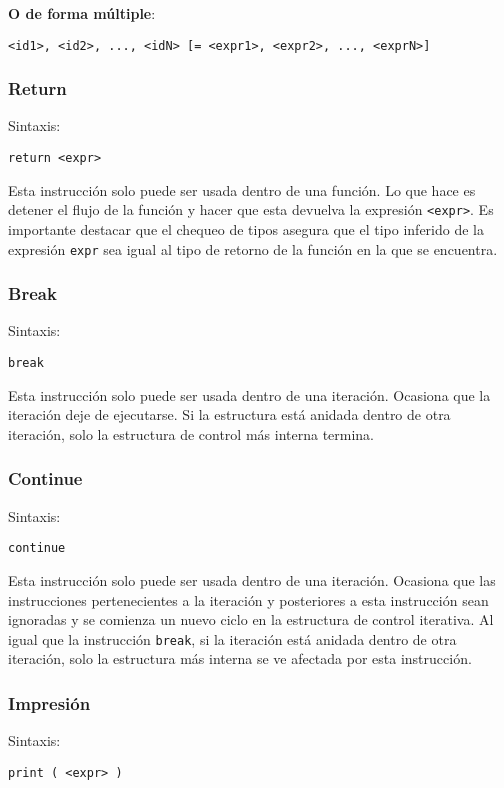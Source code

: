 \documentclass[12pt, spanish]{report}
\begin{document}
\textbf{O de forma m\'ultiple}:
\begin{verbatim}
<id1>, <id2>, ..., <idN> [= <expr1>, <expr2>, ..., <exprN>]
\end{verbatim}

\subsubsection{Return}
\label{sec:return}
Sintaxis:
\begin{verbatim}
return <expr>
\end{verbatim}

Esta instrucci\'on solo puede ser usada dentro de una funci\'on. Lo
que hace es detener el flujo de la funci\'on y hacer que esta devuelva
la expresi\'on \texttt{<expr>}. Es importante destacar que el chequeo
de tipos asegura que el tipo inferido de la expresi\'on \texttt{expr}
sea igual al tipo de retorno de la funci\'on en la que se encuentra.

\subsubsection{Break}
\label{sec:return}
Sintaxis:
\begin{verbatim}
break
\end{verbatim}

Esta instrucci\'on solo puede ser usada dentro de una
iteraci\'on. Ocasiona que la iteraci\'on deje de ejecutarse.
Si la estructura est\'a anidada dentro de otra iteraci\'on,
solo la estructura de control m\'as interna termina.

\subsubsection{Continue}
\label{sec:return}
Sintaxis:
\begin{verbatim}
continue
\end{verbatim}

Esta instrucci\'on solo puede ser usada dentro de una
iteraci\'on. Ocasiona que las instrucciones pertenecientes a la
iteraci\'on y posteriores a esta instrucci\'on sean ignoradas y se
comienza un nuevo ciclo en la estructura de control iterativa.  Al
igual que la instrucci\'on \texttt{break}, si la iteraci\'on est\'a
anidada dentro de otra iteraci\'on, solo la estructura m\'as interna
se ve afectada por esta instrucci\'on.

\subsubsection{Impresi\'on}
Sintaxis:
\begin{verbatim}
print ( <expr> )
\end{verbatim}
\end{document}
